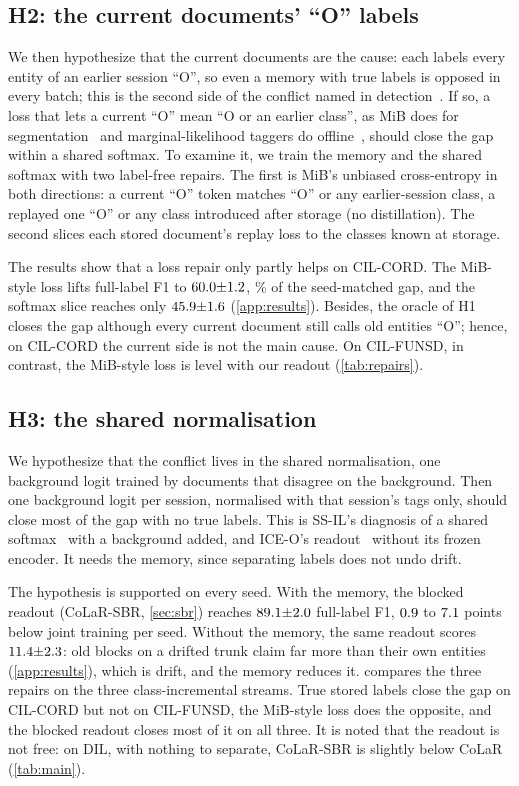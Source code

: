 \documentclass[10pt,twocolumn,letterpaper]{article}
\begin{document}
\subsection{H2: the current documents' ``O'' labels}
\label{sec:h2}
We then hypothesize that the current documents are the cause: each labels every entity of an earlier session ``O'', so even a memory with true labels is opposed in every batch; this is the second side of the conflict named in detection~\citep{mo2024bpf}. If so, a loss that lets a current ``O'' mean ``O or an earlier class'', as MiB does for segmentation~\citep{cermelli2020mib} and marginal-likelihood taggers do offline~\citep{greenberg2018marginal}, should close the gap within a shared softmax. To examine it, we train the memory and the shared softmax with two label-free repairs. The first is MiB's unbiased cross-entropy in both directions: a current ``O'' token matches ``O'' or any earlier-session class, a replayed one ``O'' or any class introduced after storage (no distillation). The second slices each stored document's replay loss to the classes known at storage.

The results show that a loss repair only partly helps on CIL-CORD. The MiB-style loss lifts full-label F1 to $60.0{\pm}1.2$, \nMibShareFull\% of the seed-matched gap, and the softmax slice reaches only $45.9{\pm}1.6$ (\cref{app:results}). Besides, the oracle of H1 closes the gap although every current document still calls old entities ``O''; hence, on CIL-CORD the current side is not the main cause. On CIL-FUNSD, in contrast, the MiB-style loss is level with our readout (\cref{tab:repairs}).

\subsection{H3: the shared normalisation}
\label{sec:h3}
We hypothesize that the conflict lives in the shared normalisation, one background logit trained by documents that disagree on the background. Then one background logit per session, normalised with that session's tags only, should close most of the gap with no true labels. This is SS-IL's diagnosis of a shared softmax~\citep{ahn2021ssil} with a background added, and ICE-O's readout~\citep{liu2023ice} without its frozen encoder. It needs the memory, since separating labels does not undo drift.

The hypothesis is supported on every seed. With the memory, the blocked readout (CoLaR-SBR, \cref{sec:sbr}) reaches $89.1{\pm}2.0$ full-label F1, $0.9$ to $7.1$ points below joint training per seed. Without the memory, the same readout scores $11.4{\pm}2.3$: old blocks on a drifted trunk claim far more than their own entities (\cref{app:results}), which is drift, and the memory reduces it.  compares the three repairs on the three class-incremental streams. True stored labels close the gap on CIL-CORD but not on CIL-FUNSD, the MiB-style loss does the opposite, and the blocked readout closes most of it on all three. It is noted that the readout is not free: on DIL, with nothing to separate, CoLaR-SBR is slightly below CoLaR (\cref{tab:main}).
\end{document}
